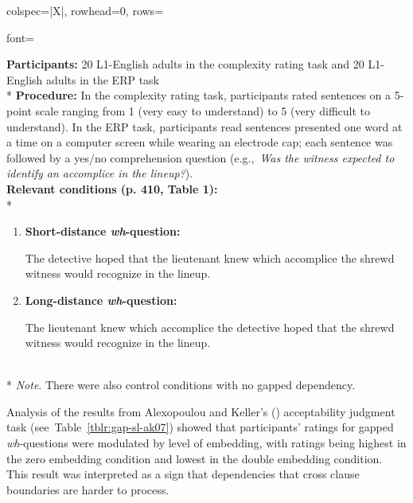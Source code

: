 \begin{longtblr}[caption={\textcite{phillips.etal2005}: Complexity rating task (Experiment 1) and ERP task (Experiment 2)}, label={tblr:gap-sl-p05}]{colspec={|X|}, rowhead=0, rows={font=\raggedright{}}}\hline
\textbf{Participants:} 20 L1-English adults in the complexity rating task and 20 L1-English adults in the ERP task \vspace{5pt}\\*
\textbf{Procedure:} In the complexity rating task, participants rated sentences on a 5-point scale ranging from 1 (very easy to understand) to 5 (very difficult to understand). In the ERP task, participants read sentences presented one word at a time on a computer screen while wearing an electrode cap; each sentence was followed by a yes/no comprehension question (e.g.,~\textit{Was the witness expected to identify an accomplice in the lineup?}). \vspace{5pt}\\
\textbf{Relevant conditions (p. 410, Table 1):} \vspace{5pt}\\*
\begin{varwidth}{\linewidth}\begin{enumerate}[\bfseries (a),itemsep=5pt] 
\item \textbf{Short-distance \textit{wh}-question:}\par\nobreak
The detective hoped that the lieutenant knew which accomplice the shrewd witness would recognize in the lineup.
\item \textbf{Long-distance \textit{wh}-question:}\par\nobreak
The lieutenant knew which accomplice the detective hoped that the shrewd witness would recognize in the lineup.
\end{enumerate}\end{varwidth}\vspace{5pt}\\*
\textit{Note}. There were also control conditions with no gapped dependency.\\\hline
\end{longtblr}

Analysis of the results from Alexopoulou and Keller's (\citeyear{alexopoulou.keller2007}) acceptability judgment task (see~Table~\ref{tblr:gap-sl-ak07}) showed that participants' ratings for gapped \textit{wh}-questions were modulated by level of embedding, with ratings being highest in the zero embedding condition and lowest in the double embedding condition. This result was interpreted as a sign that dependencies that cross clause boundaries are harder to process.

